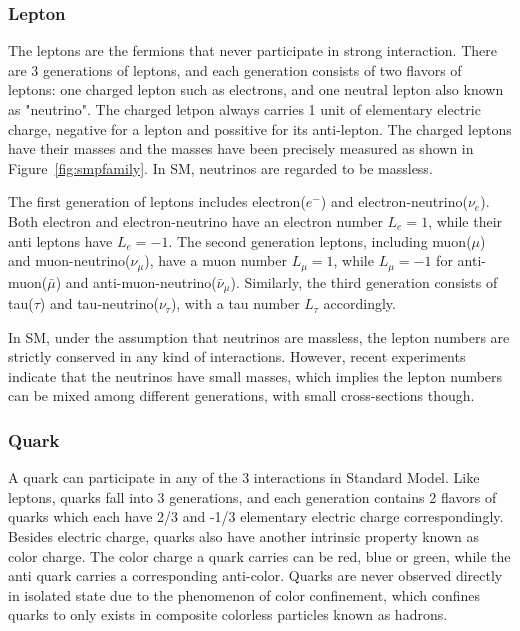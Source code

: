 \subsubsection{Lepton}
The leptons are the fermions that never participate in strong interaction. There are 3 generations of leptons, and each generation consists of two flavors of leptons: one charged lepton such as electrons, and one neutral lepton also known as "neutrino". The charged letpon always carries 1 unit of elementary electric charge, negative for a lepton and possitive for its anti-lepton. The charged leptons have their masses and the masses have been precisely measured as shown in Figure~\ref{fig:smpfamily}. In SM, neutrinos are regarded to be massless.

\vspace{0.3cm}
The first generation of leptons includes electron($e^{-}$) and electron-neutrino($\nu _{e}$). Both electron and electron-neutrino have an electron number $L_{e}=1$, while their anti leptons have $L_{e}=-1$. The second generation leptons, including muon($\mu$) and muon-neutrino($\nu_{\mu}$), have a muon number $L_{\mu}=1$, while $L_{\mu }=-1$ for anti-muon($\bar{\mu}$) and anti-muon-neutrino($\bar{\nu} _{\mu }$). Similarly, the third generation consists of tau($\tau$) and tau-neutrino($\nu _{\tau }$), with a tau number $L_{\tau}$ accordingly.

\vspace{0.3cm}
In SM, under the assumption that neutrinos are massless, the lepton numbers are strictly conserved in any kind of interactions. However, recent experiments\cite{neutrinoOscillation1,neutrinoOscillation2} indicate that the neutrinos have small masses, which implies the lepton numbers can be mixed among different generations,  with small cross-sections though.
\subsubsection{Quark}
A quark can participate in any of the 3 interactions in Standard Model. Like leptons, quarks fall into 3 generations, and each generation contains 2 flavors of quarks which each have 2/3 and -1/3 elementary electric charge correspondingly. Besides electric charge, quarks also have another intrinsic property known as color charge. The color charge a quark carries can be red, blue or green, while the anti quark carries a corresponding anti-color. Quarks are never observed directly in isolated state due to the phenomenon of color confinement, which confines quarks to only exists in composite colorless particles known as hadrons.

